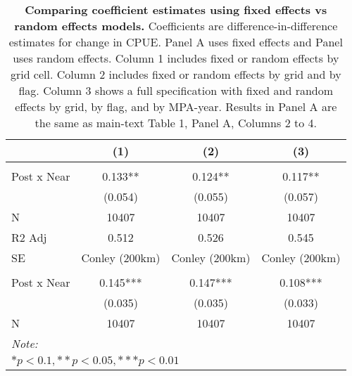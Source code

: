 \begin{table}

\caption{\label{tab:fe_vs_re}\textbf{Comparing coefficient estimates using fixed effects vs random effects models.}
             Coefficients are difference-in-difference estimates for change in CPUE.
             Panel A uses fixed effects and Panel uses random effects.
             Column 1 includes fixed or random effects by grid cell. Column 2 includes fixed or random
             effects by grid and by flag. Column 3 shows a full specification with fixed and random effects by grid, by
             flag, and by MPA-year. Results in Panel A are the same as main-text Table 1, Panel A, Columns 2 to 4.}
\centering
\begin{tabular}[t]{lccc}
\toprule
  & (1) & (2) & (3)\\
\midrule
\addlinespace[0.3em]
\multicolumn{4}{l}{Panel A: Fixed effects}\\
\hspace{1em}Post x Near & 0.133** & 0.124** & 0.117**\\
\hspace{1em} & (0.054) & (0.055) & (0.057)\\
\hspace{1em}N & 10407 & 10407 & \vphantom{1} 10407\\
\hspace{1em}R2 Adj & 0.512 & 0.526 & 0.545\\
\hspace{1em}SE & Conley (200km) & Conley (200km) & Conley (200km)\\
\addlinespace[0.5cm]
\multicolumn{4}{l}{Panel B: Random effects}\\
\hspace{1em}Post x Near & 0.145*** & 0.147*** & 0.108***\\
\hspace{1em} & (0.035) & (0.035) & (0.033)\\
\hspace{1em}N & 10407 & 10407 & 10407\\
\midrule
\midrule
\bottomrule
\multicolumn{4}{l}{\rule{0pt}{1em}\textit{Note: }}\\
\multicolumn{4}{l}{\rule{0pt}{1em}$* p < 0.1, ** p < 0.05, *** p < 0.01$}\\
\end{tabular}
\end{table}